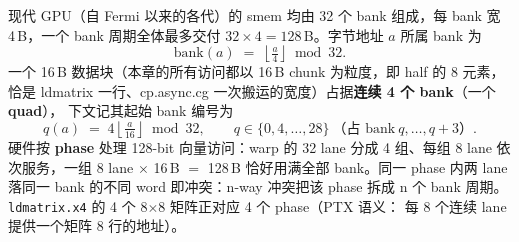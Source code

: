 现代 GPU（自 Fermi 以来的各代）的 smem 均由 32 个 bank 组成，每 bank 宽 4\,B，一个 bank 周期全体最多交付
$32\times4=128$\,B。字节地址 $a$ 所属 bank 为
\begin{equation}
  \mathrm{bank}(a) \;=\; \left\lfloor \tfrac{a}{4} \right\rfloor \bmod 32 .
  \label{eq:12-bank}
\end{equation}
一个 16\,B 数据块（本章的所有访问都以 16\,B chunk 为粒度，即 half 的 8 元素，
恰是 ldmatrix 一行、cp.async.cg 一次搬运的宽度）占据\textbf{连续 4 个 bank}（一个\textbf{quad}），
下文记其起始 bank 编号为
\begin{equation}
  q(a) \;=\; 4\left\lfloor \tfrac{a}{16} \right\rfloor \bmod 32, \qquad
  q \in \{0,4,\dots,28\}\ \text{（占 bank}\ q,\dots,q{+}3\text{）}.
\end{equation}
硬件按 \textbf{phase} 处理 128-bit 向量访问：warp 的 32 lane 分成 4 组、每组
8 lane 依次服务，一组 8 lane $\times$ 16\,B $=$ 128\,B 恰好用满全部 bank。同一
phase 内两 lane 落同一 bank 的不同 word 即冲突：n-way 冲突把该 phase 拆成 n 个
bank 周期。\texttt{ldmatrix.x4} 的 4 个 8$\times$8 矩阵正对应 4 个 phase（PTX 语义：
每 8 个连续 lane 提供一个矩阵 8 行的地址）。

